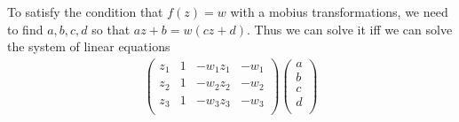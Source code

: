 \documentclass{homework}
\begin{document}
\begin{solution}
                                                                                                                                                                                                To satisfy the condition that $f(z) = w$ with a mobius transformations, we need to find $a,b,c,d$ so that $az + b = w(cz + d)$. Thus we can solve it iff we can solve the system of linear equations
                                                                                                                                                                                                \begin{align*}
                                                                                                                                                                                                    \begin{pmatrix}
                                                                                                                                                                                                        z_1&1&-w_1z_1&-w_1\\
                                                                                                                                                                                                            z_2&1&-w_2z_2&-w_2\\
                                                                                                                                                                                                                z_3&1&-w_3z_3&-w_3\\
                                                                                                                                                                                                                    \end{pmatrix}
                                                                                                                                                                                                                        \begin{pmatrix}
                                                                                                                                                                                                                            a\\b\\c\\d\\

\end{pmatrix}
\end{align*}
\end{solution}
\end{document}
